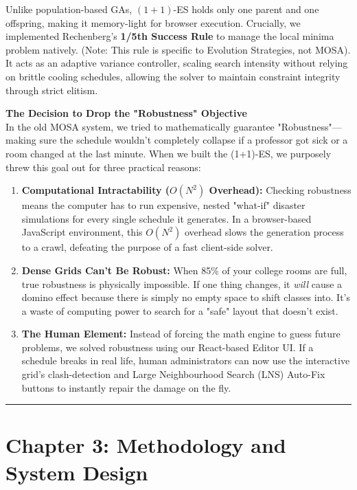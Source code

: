 \documentclass{article}
\begin{document}
Unlike population-based GAs, $(1+1)$-ES holds only one parent and one offspring, making it memory-light for browser execution. Crucially, we implemented Rechenberg’s \textbf{1/5th Success Rule} to manage the local minima problem natively. (Note: This rule is specific to Evolution Strategies, not MOSA). It acts as an adaptive variance controller, scaling search intensity without relying on brittle cooling schedules, allowing the solver to maintain constraint integrity through strict elitism.

\vspace{3mm}
\noindent\textbf{The Decision to Drop the "Robustness" Objective}\\
In the old MOSA system, we tried to mathematically guarantee "Robustness"---making sure the schedule wouldn't completely collapse if a professor got sick or a room changed at the last minute. When we built the (1+1)-ES, we purposely threw this goal out for three practical reasons:
\begin{enumerate}
    \item \textbf{Computational Intractability ($O(N^2)$ Overhead):} Checking robustness means the computer has to run expensive, nested "what-if" disaster simulations for every single schedule it generates. In a browser-based JavaScript environment, this $O(N^2)$ overhead slows the generation process to a crawl, defeating the purpose of a fast client-side solver.
    \item \textbf{Dense Grids Can't Be Robust:} When 85\% of your college rooms are full, true robustness is physically impossible. If one thing changes, it \textit{will} cause a domino effect because there is simply no empty space to shift classes into. It’s a waste of computing power to search for a "safe" layout that doesn't exist.
    \item \textbf{The Human Element:} Instead of forcing the math engine to guess future problems, we solved robustness using our React-based Editor UI. If a schedule breaks in real life, human administrators can now use the interactive grid's clash-detection and Large Neighbourhood Search (LNS) Auto-Fix buttons to instantly repair the damage on the fly.
\end{enumerate}

\vspace{5mm}
\hrule
\vspace{5mm}

\section*{Chapter 3: Methodology and System Design}
\end{document}
